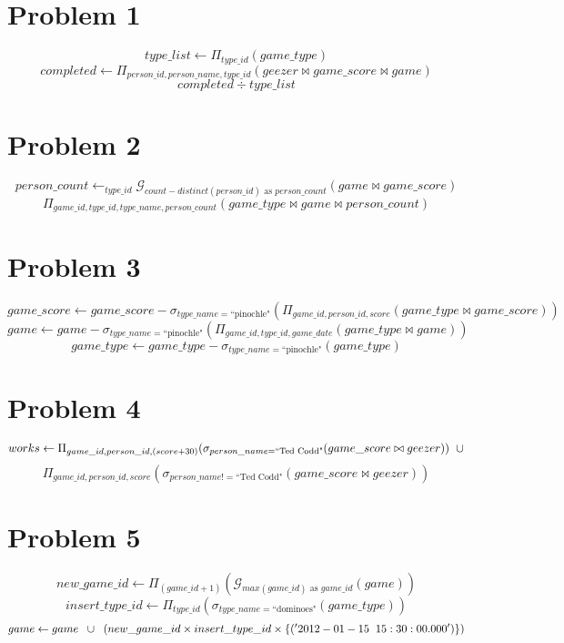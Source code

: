 \documentclass{article}
\begin{document}
\section*{Problem 1}
\[ type\_list \leftarrow \Pi_{type\_id} (game\_type) \]
\[ completed \leftarrow \Pi_{person\_id, person\_name, type\_id} (geezer \bowtie
        game\_score \bowtie game) \]
\[ completed \div type\_list \]

\section*{Problem 2}
\[ person\_count \leftarrow
    _{type\_id} \mathcal{G}_{count-distinct(person\_id) \text{ as }
    person\_count} (game \bowtie game\_score) \]
\[ \Pi_{game\_id, type\_id, type\_name, person\_count}(game\_type \bowtie game
    \bowtie person\_count) \]

\section*{Problem 3}
\[ game\_score \leftarrow game\_score - \sigma_{type\_name = \text{``pinochle"}}
    (\Pi_{game\_id, person\_id, score}(game\_type \bowtie game\_score)) \]
\[ game \leftarrow game - \sigma_{type\_name = \text{``pinochle"}}
    (\Pi_{game\_id, type\_id, game\_date}(game\_type \bowtie game)) \]
\[ game\_type \leftarrow game\_type - \sigma_{type\_name = \text{``pinochle"}}
        (game\_type) \]

\section*{Problem 4}
\[ works \leftarrow \Pi_{game\_id, person\_id, (score + 30)}
        (\sigma_{person\_name = \text{``Ted Codd"}}(game\_score \bowtie geezer))
        \hspace{2mm} \cup
    \]
    \[
        \Pi_{game\_id, person\_id, score}
        (\sigma_{person\_name != \text{``Ted Codd"}}(game\_score \bowtie geezer))
    \]

\section*{Problem 5}
\[ new\_game\_id \leftarrow \Pi_{(game\_id + 1)}
    (\mathcal{G}_{max(game\_id) \text{ as } game\_id}(game)) \]
\[ insert\_type\_id \leftarrow \Pi_{type\_id}
    (\sigma_{type\_name = \text{``dominoes"}}(game\_type)) \]
\[ game \leftarrow game \hspace{2mm} \cup \hspace{2mm}
    (new\_game\_id \times insert\_type\_id \times
    \{('2012-01-15\hspace{2mm} 15:30:00.000')\}) \]
\end{document}

